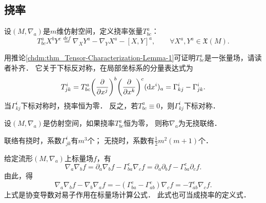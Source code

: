 \subsection{挠率}\label{chccr:sec_torsion}
\begin{definition}
    设$(M,\nabla_a)$是$m$维仿射空间，定义挠率张量$T_{bc}^a$：
    \begin{equation}\label{chccr:eqn_Ttorsion}
        T_{bc}^a{X^b}{Y^c} \overset{def}{=} {\nabla _X}{Y^a} - {\nabla _Y}{X^a} - {\left[ {X,Y} \right]^a} ,
        \qquad \forall X^a, Y^a \in \mathfrak{X}(M) .
    \end{equation}
\end{definition}
用推论\ref{chdm:thm_Tensor-Characterization-Lemma-1}可证明$T_{bc}^a$是一张量场，请读者补齐．
它关于下标反对称，在局部坐标系的分量表达式为
\begin{equation}\label{chccr:eqn_Ttorsion-comp}
    T_{jk}^i=T_{bc}^a{\left(\frac{\partial}{\partial x^j}\right)^b}
    {\left(\frac{\partial}{\partial x^k}\right)^c}
    ({\rm d} x^i)_a = \Gamma^{i}_{kj} - \Gamma^{i}_{jk} .
\end{equation}
当$\Gamma^{i}_{kj}$下标对称时，挠率恒为零．
反之，若$T_{bc}^a\equiv 0$，则$\Gamma^{i}_{kj}$下标对称．
\begin{definition}
    设$(M,\nabla_a)$是仿射空间，如果挠率$T_{bc}^a$恒为零，
    则称$\nabla_a$为{\heiti 无挠联络}．
\end{definition}

\begin{remark}\label{chccr:remark_connection-coef-num}
    联络有挠时，系数$\Gamma^{i}_{jk}$有$m^3$个；
    无挠时，系数有$\frac{1}{2}m^2(m+1)$个．
\end{remark}


给定流形$(M,\nabla_a)$上标量场$f$，有
\begin{equation}
    \nabla_a\nabla_b f= \partial_a\nabla_b f - \Gamma_{ba}^c \nabla_c f
    = \partial_a\partial_b f - \Gamma_{ba}^c \partial_c f .
\end{equation}
由此，得
\begin{equation}\label{chccr:eqn_scalar-torsion}
    \nabla_a\nabla_b f - \nabla_b\nabla_a f=  - (\Gamma_{ba}^c-\Gamma_{ab}^c) \nabla_c f
    = - T_{ab}^c \nabla_c f .
\end{equation}
上式是协变导数对易子作用在标量场计算公式．
此式也可当成挠率的定义式．







